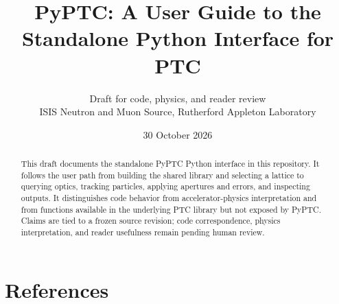 \documentclass{isistechreport}
\title{PyPTC: A User Guide to the Standalone Python Interface for PTC}
\author{Draft for code, physics, and reader review\\ISIS Neutron and Muon Source, Rutherford Appleton Laboratory}
\date{30 October 2026}
\begin{document}
\maketitle
\begin{abstract}
This draft documents the standalone PyPTC Python interface in this repository. It follows the user path from building the shared library and selecting a lattice to querying optics, tracking particles, applying apertures and errors, and inspecting outputs. It distinguishes code behavior from accelerator-physics interpretation and from functions available in the underlying PTC library but not exposed by PyPTC. Claims are tied to a frozen source revision; code correspondence, physics interpretation, and reader usefulness remain pending human review.
\end{abstract}
\tableofcontents
\clearpage










\section{References}
\nocite{ForestSchmidtMcIntosh2002,ForestNogiwaSchmidt2006FPPPTC,ForestNogiwaSchmidt2006FPPDoc,Schmidt2005MADXPTC,SkowronskiSchmidtForest2007,MADXPTCManual2006,ForestSchmidtPTCManual2010,Forest2016Tracking}


\end{document}
